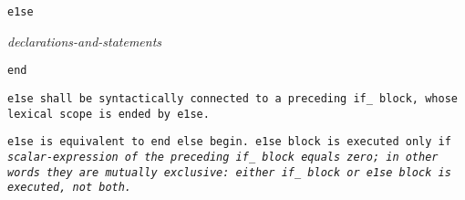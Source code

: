 
\tt{e1se}

\s\s\s\s\it{declarations-and-statements}\opt

\tt{end}


\tt{e1se} shall be syntactically connected to a preceding \tt{if_} block,
whose lexical scope is ended by \tt{e1se}.


\tt{e1se} is equivalent to \tt{end else begin}.
\tt{e1se} block is executed only if \it{scalar-expression}
of the preceding \tt{if_} block equals zero;
in other words they are mutually exclusive:
either \tt{if_} block or \tt{e1se} block is executed, not both.
